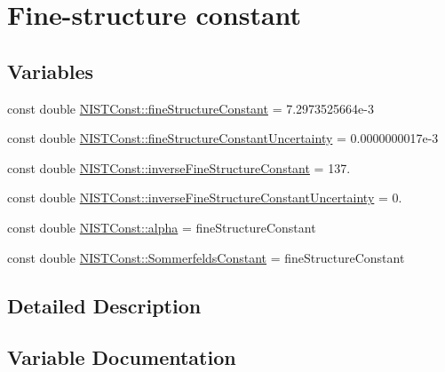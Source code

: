 \hypertarget{group___fine_structure_constant}{}\section{Fine-\/structure constant}
\label{group___fine_structure_constant}
\subsection*{Variables}
\begin{DoxyCompactItemize}
\item 
const double \hyperlink{group___fine_structure_constant_ga0f1ddaca2627b7253ed177aa1b074724}{N\+I\+S\+T\+Const\+::fine\+Structure\+Constant} = 7.\+2973525664e-\/3
\item 
const double \hyperlink{group___fine_structure_constant_ga18067d14fb16cc6418212812405e6496}{N\+I\+S\+T\+Const\+::fine\+Structure\+Constant\+Uncertainty} = 0.\+0000000017e-\/3
\item 
const double \hyperlink{group___fine_structure_constant_gaa4cd257f5376577cf0331e71dd952bb6}{N\+I\+S\+T\+Const\+::inverse\+Fine\+Structure\+Constant} = 137.
\item 
const double \hyperlink{group___fine_structure_constant_gae26a4808ef23039e47ea7fc6d971d420}{N\+I\+S\+T\+Const\+::inverse\+Fine\+Structure\+Constant\+Uncertainty} = 0.
\item 
const double \hyperlink{group___fine_structure_constant_gac2d74edeb9ba449e5e687a2cdbb139e9}{N\+I\+S\+T\+Const\+::alpha} = fine\+Structure\+Constant
\item 
const double \hyperlink{group___fine_structure_constant_gaa076e4b419cd726407c8e2e9a44a381b}{N\+I\+S\+T\+Const\+::\+Sommerfelds\+Constant} = fine\+Structure\+Constant
\end{DoxyCompactItemize}


\subsection{Detailed Description}


\subsection{Variable Documentation}
\mbox{\label{group___fine_structure_constant_gac2d74edeb9ba449e5e687a2cdbb139e9}} 
